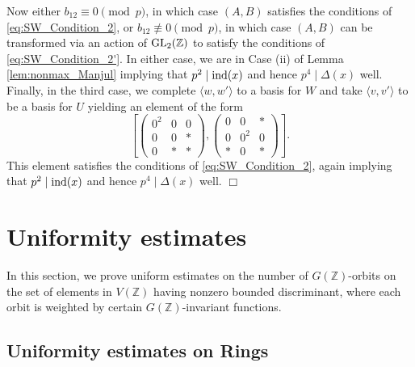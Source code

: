 \documentclass{article}
\def\Z{{\mathbb Z}}
\def\GL{{\rm GL}}
\def\ind{{\rm ind}}
\def\Z{{\mathbb Z}}
\newenvironment{proof}{\noindent {\bf Proof:}}{$\Box$ \vspace{2 ex}}
\begin{document}
\begin{proof}
\begin{equation*}
\end{equation*}
Now either $b_{12}\equiv 0\pmod{p}$, in which case $(A,B)$ satisfies the conditions of \eqref{eq:SW_Condition_2}, or $b_{12}\not\equiv 0\pmod{p}$, in which case $(A,B)$ can be transformed via an action of $\GL_2(\Z)$ to satisfy the conditions of \eqref{eq:SW_Condition_2'}. In either case, we are in Case (ii) of Lemma \ref{lem:nonmax_Manjul} implying that $p^2\mid \ind(x)$ and hence $p^4\mid\Delta(x)$ well. Finally, in the third case, we complete $\langle w,w'\rangle$ to a basis for $W$ and take $\langle v,v'\rangle$ to be a basis for $U$ yielding an element of the form
\begin{equation*}
\left[\begin{pmatrix}0^2&{0}&{0}\\{0}&{0}&{*}\\{0}&{*}&{*}\end{pmatrix},\begin{pmatrix} 0&{0}&{*}\\{0}&{0^2}&{0}\\{*}&{0}&{*}\end{pmatrix}\right].
\end{equation*}
This element satisfies the conditions of \eqref{eq:SW_Condition_2}, again implying that $p^2\mid \ind(x)$ and hence $p^4\mid\Delta(x)$ well.
\end{proof}

\section{Uniformity estimates}

In this section, we prove uniform estimates on the number of $G(\Z)$-orbits on the set of elements in $V(\Z)$ having nonzero bounded discriminant, where each orbit is weighted by certain $G(\Z)$-invariant functions.

\subsection{Uniformity estimates on Rings}
\end{document}
